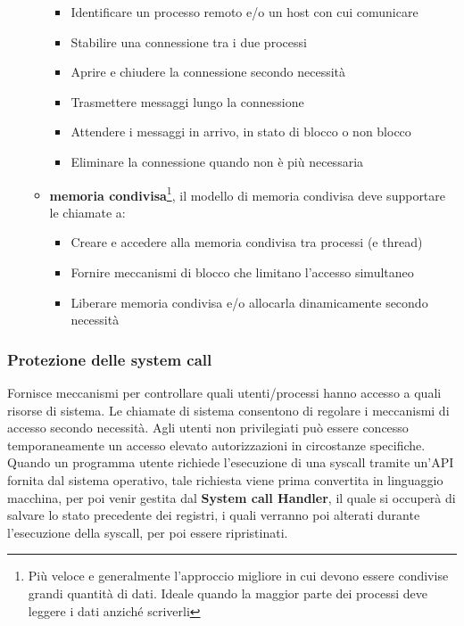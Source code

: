 \documentclass{article}
\begin{document}
\begin{itemize}
\begin{itemize}
        \begin{itemize}
            \item Identificare un processo remoto e/o un host con cui comunicare
            \item Stabilire una connessione tra i due processi
            \item Aprire e chiudere la connessione secondo necessità
            \item Trasmettere messaggi lungo la connessione
            \item Attendere i messaggi in arrivo, in stato di blocco o non blocco
            \item Eliminare la connessione quando non è più necessaria
        \end{itemize}
        \item \textbf{memoria condivisa}\footnote{Più veloce e generalmente l'approccio migliore in cui devono essere condivise grandi quantità di dati. Ideale quando la maggior parte dei processi deve leggere i dati anziché scriverli}, il modello di memoria condivisa deve supportare le chiamate a:
        \begin{itemize}
            \item  Creare e accedere alla memoria condivisa tra processi (e thread) 
            \item Fornire meccanismi di blocco che limitano l'accesso simultaneo
            \item Liberare memoria condivisa e/o allocarla dinamicamente secondo necessità
        \end{itemize}
    \end{itemize}
\end{itemize}

\subsubsection{Protezione delle system call}
Fornisce meccanismi per controllare quali utenti/processi hanno accesso a quali risorse di sistema. Le chiamate di sistema consentono di regolare i meccanismi di accesso secondo necessità. Agli utenti non privilegiati può essere concesso temporaneamente un accesso elevato autorizzazioni in circostanze specifiche. 
Quando un programma utente richiede l'esecuzione di una syscall tramite un'API fornita dal sistema operativo, tale richiesta viene prima convertita in linguaggio macchina, per poi venir gestita dal \textbf{System call Handler}, il quale si occuperà di salvare lo stato precedente dei registri, i quali verranno poi alterati durante l'esecuzione della syscall, per poi essere ripristinati. 
\end{document}
